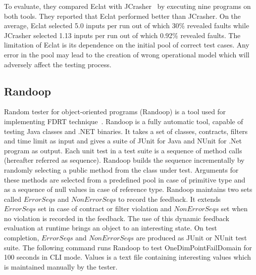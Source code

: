 To evaluate, they compared Eclat with JCrasher~\cite{csallner2004jcrasher} by executing nine programs on  both tools. They reported that Eclat performed better than JCrasher. On the average, Eclat selected 5.0 inputs per run out of which 30\% revealed faults while JCrasher selected 1.13 inputs per run out of which 0.92\% revealed faults. The limitation of Eclat is its dependence on the initial pool of correct test cases. Any error in the pool may lead to the creation of wrong operational model which will adversely affect the testing process.   



\subsection{Randoop} \label{sec:Randoop}
Random tester for object-oriented programs (Randoop) is a tool used for implementing FDRT technique~\cite{pacheco2007randoop}. Randoop is a fully automatic tool, capable of testing Java classes and .NET binaries. It takes a set of classes, contracts, filters and time limit as input and gives a suite of JUnit for Java and NUnit for .Net program as output. Each unit test in a test suite is a sequence of method calls (hereafter referred as sequence). Randoop builds the sequence incrementally by randomly selecting a public method from the class under test.  Arguments for these methods are selected from a predefined pool in case of primitive type and as a sequence of null values in case of reference type. Randoop maintains two sets called $ErrorSeqs$ and $NonErrorSeqs$ to record the feedback. It extends $ErrorSeqs$ set in case of contract or filter violation and $NonErrorSeqs$ set when no violation is recorded in the feedback. The use of this dynamic feedback evaluation at runtime brings an object to an interesting state. On test completion, $ErrorSeqs$ and $NonErrorSeqs$ are produced as JUnit or NUnit test suite. The following command runs Randoop to test OneDimPointFailDomain for 100 seconds in CLI mode. Values is a text file containing interesting values which is maintained manually by the tester.

